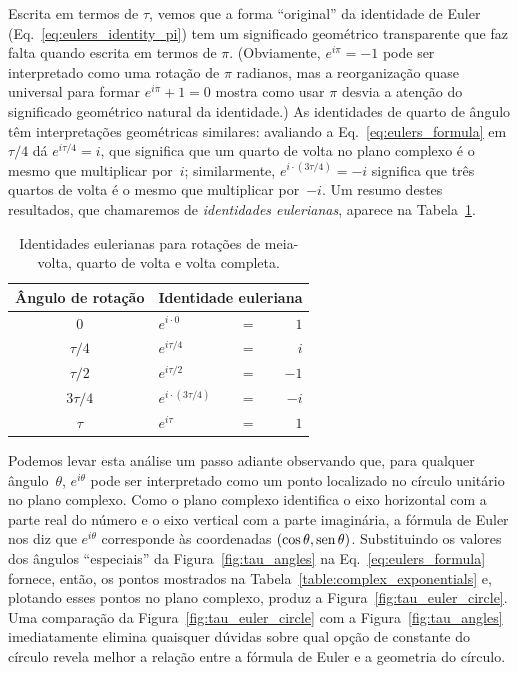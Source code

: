 Escrita em termos de $\tau$, vemos que a forma ``original'' da identidade de Euler (Eq.~\eqref{eq:eulers_identity_pi}) tem um significado geométrico transparente que faz falta quando escrita em termos de $\pi$. (Obviamente, $e^{i\pi} = -1$ pode ser interpretado como uma rotação de $\pi$ radianos, mas a reorganização quase universal para formar $e^{i\pi} + 1 = 0$ mostra como usar $\pi$ desvia a atenção do significado geométrico natural da identidade.) As identidades de quarto de ângulo têm interpretações geométricas similares: avaliando a Eq.~\eqref{eq:eulers_formula} em $\tau/4$ dá $e^{i\tau/4} = i$, que significa que um quarto de volta no plano complexo é o mesmo que multiplicar por~$i$; similarmente, $e^{i\cdot(3\tau/4)} = -i$ significa que três quartos de volta é o mesmo que multiplicar por~$-i$. Um resumo destes resultados, que chamaremos de \emph{identidades eulerianas}, aparece na Tabela~\ref{table:eulerian_identities}.

\begin{table}
\begin{center}
\begin{tabular}{cllr}
Ângulo de rotação & \multicolumn{3}{c}{Identidade euleriana} \\ \hline
$0$ & $e^{i\cdot0}$ & $ = $ & $1$ \smallskip \\
$\tau/4$ & $e^{i\tau/4}$ & $ = $ & $i$ \smallskip \\
$\tau/2$ & $e^{i\tau/2}$ & $ = $ & $-1$ \smallskip \\
$3\tau/4$ & $e^{i\cdot(3\tau/4)}$ & $ = $ & $-i$ \smallskip \\
$\tau$ & $e^{i\tau}$ & $ = $ & $1$
\end{tabular}
\end{center}
\caption{Identidades eulerianas para rotações de meia-volta, quarto de volta e volta completa.\label{table:eulerian_identities}}
\end{table}

Podemos levar esta análise um passo adiante observando que, para qualquer ângulo~$\theta$, $e^{i\theta}$ pode ser interpretado como um ponto localizado no círculo unitário no plano complexo. Como o plano complexo identifica o eixo horizontal com a parte real do número e o eixo vertical com a parte imaginária, a fórmula de Euler nos diz que $e^{i\theta}$ corresponde às coordenadas $(\cos\theta, \mbox{sen}\,\theta)$. Substituindo os valores dos ângulos ``especiais'' da Figura~\ref{fig:tau_angles} na Eq.~\eqref{eq:eulers_formula} fornece, então, os pontos mostrados na Tabela~\ref{table:complex_exponentials} e, plotando esses pontos no plano complexo, produz a Figura~\ref{fig:tau_euler_circle}. Uma comparação da Figura~\ref{fig:tau_euler_circle} com a Figura~\ref{fig:tau_angles} imediatamente elimina quaisquer dúvidas sobre qual opção de constante do círculo revela melhor a relação entre a fórmula de Euler e a geometria do círculo.

